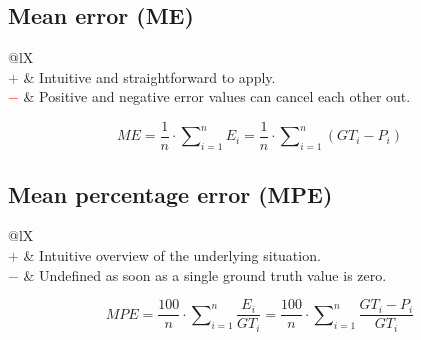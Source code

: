 \documentclass{article}
\begin{document}
\subsection[Mean error (ME)]{Mean error (ME) \cite{fisher1920012, anjali2019temperature}}

\begin{table}[H]\centering
	\begin{tabularx}{\textwidth}{@{}lX}
		 \\
		\textcolor{Green}{$+$} & Intuitive and straightforward to apply. \\
		\textcolor{Red}{$-$}   & Positive and negative error values can cancel each other out.
	\end{tabularx}
\end{table}

\begin{equation}
	\textit{ME} = \dfrac{1}{n} \cdot \sum\nolimits_{i = 1}^n E_i = \dfrac{1}{n} \cdot \sum\nolimits_{i = 1}^n (\textit{GT}_i - P_i)
%
	\label{equation:ME}
\end{equation}


\subsection[Mean percentage error (MPE)]{Mean percentage error (MPE) \cite{pearson1895x, jiang2008prediction}}

\begin{table}[H]\centering
	\begin{tabularx}{\textwidth}{@{}lX}
		 \\
		\textcolor{Green}{$+$} & Intuitive overview of the underlying situation. \\
		\textcolor{Red}{$-$}   & Undefined as soon as a single ground truth value is zero.
	\end{tabularx}
\end{table}

\begin{equation}
	\textit{MPE} = \dfrac{100}{n} \cdot \sum\nolimits_{i = 1}^n \dfrac{E_i}{\textit{GT}_i} = \dfrac{100}{n} \cdot \sum\nolimits_{i = 1}^n \dfrac{\textit{GT}_i - P_i}{\textit{GT}_i}
%
	\label{equation:MPE}
\end{equation}
\end{document}

